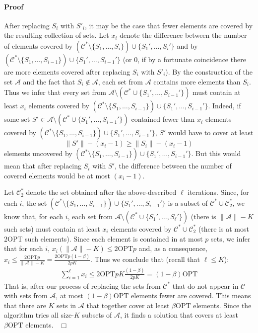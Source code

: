 \documentclass[11pt]{article}
\newcommand{\OPT}{{{{\mathrm{OPT}}}}}
\newenvironment{proof}{\paragraph{Proof}}{\hfill$\Box$\medskip}
\newcommand{\calC}{{{\mathcal{C}}}}
\newcommand{\calA}{{{\mathcal{A}}}}
\begin{document}
\begin{proof}
  After replacing $S_i$ with $S'_i$, it may be the case that fewer
  elements are covered by the resulting collection of sets. Let $x_i$
  denote the difference between the number of elements covered by
  $(\mathcal{C}^{*} \setminus \{S_1, \dots, S_{i}\}) \cup \{S_1',
  \dots, S_{i}'\}$ and by $(\mathcal{C}^{*} \setminus \{S_1, \dots,
  S_{i-1}\}) \cup \{S_1', \dots, S_{i-1}'\}$ (or $0$, if by a
  fortunate coincidence there are more elements covered after
  replacing $S_i$ with $S'_i$). By the construction of the set $\calA$
  and the fact that $S_i \notin \calA$, each set from $\mathcal{A}$
  contains more elements than $S_i$. Thus we infer that every set from
  $\mathcal{A} \setminus (\mathcal{C}^{*} \cup \{S_1', \dots,
  S_{i-1}'\})$ must contain at least $x_i$ elements covered by
  $(\mathcal{C}^{*} \setminus \{S_1, \dots, S_{i-1}\}) \cup \{S_1',
  \dots, S_{i-1}'\}$. Indeed, if some set $S' \in \mathcal{A}
  \setminus (\mathcal{C}^{*} \cup \{S_1', \dots, S_{i-1}'\})$
  contained fewer than $x_i$ elements covered by $(\mathcal{C}^{*}
  \setminus \{S_1, \dots, S_{i-1}\}) \cup \{S_1', \dots, S_{i-1}'\}$,
  $S'$ would have to cover at least \[\|S'\|-(x_i-1) \geq \|S_i\|
  -(x_i-1)\] elements uncovered by $(\mathcal{C}^{*} \setminus \{S_1,
  \dots, S_{i-1}\}) \cup \{S_1', \dots, S_{i-1}'\}$. But this would
  mean that after replacing $S_i$ with $S'$, the difference between
  the number of covered elements would be at most $(x_i - 1)$.




  Let $\calC^{*}_{2}$ denote the set obtained after the
  above-described $\ell$ iterations. Since, for each $i$, the set
  $(\calC^{*} \setminus \{S_1, \dots, S_{i-1}\}) \cup \{S_1', \dots,
  S_{i-1}'\}$ is a subset of $\calC^{*} \cup \calC^{*}_{2}$, we know
  that, for each $i$, each set from $\mathcal{A} \setminus
  (\mathcal{C}^{*} \cup \{S_1', \dots, S_{\ell}'\})$ (there is
  $\|\mathcal{A}\| - K$ such sets) must contain at least $x_i$
  elements covered by $\calC^{*} \cup \calC^{*}_{2}$ (there is at most
  $2\OPT$ such elements).  Since each element is contained in at most
  $p$ sets, we infer that for each $i$, $x_i(\|\mathcal{A}\| - K) \leq
  2\OPT p$ and, as a consequence, $x_i \leq \frac{2\OPT
    p}{\|\mathcal{A}\| - K} = \frac{2\OPT p(1-\beta)}{2pK}$.  Thus we
  conclude that (recall that $\ell \leq K$):
  \begin{align*}
    \sum_{i=1}^\ell x_i \leq 2\OPT p K \frac{(1 - \beta)}{2p K} = (1 - \beta)\OPT
  \end{align*}
  That is, after our process of replacing the sets from $\calC^*$ that
  do not appear in $\calC$ with sets from $\calA$, at most
  $(1-\beta)\OPT$ elements fewer are covered. This means that there
  are $K$ sets in $\calA$ that together cover at least $\beta\OPT$
  elements. Since the algorithm tries all size-$K$ subsets of $\calA$,
  it finds a solution that covers at least $\beta\OPT$ elements.~
\end{proof}
\end{document}
